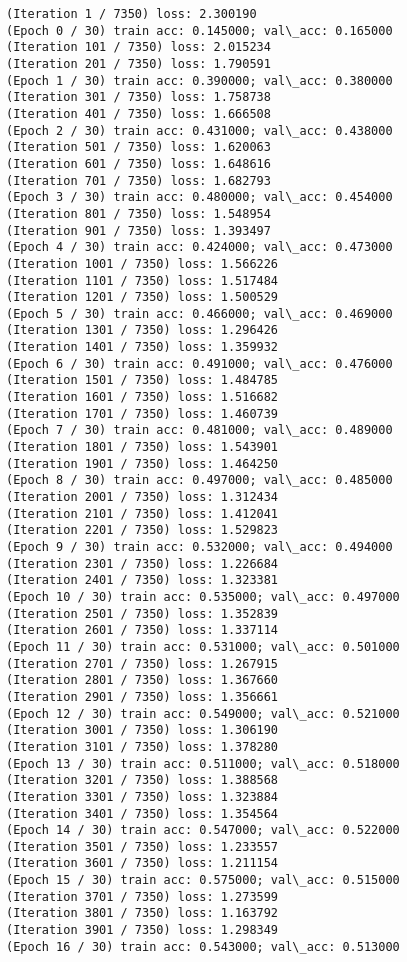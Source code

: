 \documentclass[11pt]{article}
\begin{document}
    \begin{Verbatim}[commandchars=\\\{\}]
(Iteration 1 / 7350) loss: 2.300190
(Epoch 0 / 30) train acc: 0.145000; val\_acc: 0.165000
(Iteration 101 / 7350) loss: 2.015234
(Iteration 201 / 7350) loss: 1.790591
(Epoch 1 / 30) train acc: 0.390000; val\_acc: 0.380000
(Iteration 301 / 7350) loss: 1.758738
(Iteration 401 / 7350) loss: 1.666508
(Epoch 2 / 30) train acc: 0.431000; val\_acc: 0.438000
(Iteration 501 / 7350) loss: 1.620063
(Iteration 601 / 7350) loss: 1.648616
(Iteration 701 / 7350) loss: 1.682793
(Epoch 3 / 30) train acc: 0.480000; val\_acc: 0.454000
(Iteration 801 / 7350) loss: 1.548954
(Iteration 901 / 7350) loss: 1.393497
(Epoch 4 / 30) train acc: 0.424000; val\_acc: 0.473000
(Iteration 1001 / 7350) loss: 1.566226
(Iteration 1101 / 7350) loss: 1.517484
(Iteration 1201 / 7350) loss: 1.500529
(Epoch 5 / 30) train acc: 0.466000; val\_acc: 0.469000
(Iteration 1301 / 7350) loss: 1.296426
(Iteration 1401 / 7350) loss: 1.359932
(Epoch 6 / 30) train acc: 0.491000; val\_acc: 0.476000
(Iteration 1501 / 7350) loss: 1.484785
(Iteration 1601 / 7350) loss: 1.516682
(Iteration 1701 / 7350) loss: 1.460739
(Epoch 7 / 30) train acc: 0.481000; val\_acc: 0.489000
(Iteration 1801 / 7350) loss: 1.543901
(Iteration 1901 / 7350) loss: 1.464250
(Epoch 8 / 30) train acc: 0.497000; val\_acc: 0.485000
(Iteration 2001 / 7350) loss: 1.312434
(Iteration 2101 / 7350) loss: 1.412041
(Iteration 2201 / 7350) loss: 1.529823
(Epoch 9 / 30) train acc: 0.532000; val\_acc: 0.494000
(Iteration 2301 / 7350) loss: 1.226684
(Iteration 2401 / 7350) loss: 1.323381
(Epoch 10 / 30) train acc: 0.535000; val\_acc: 0.497000
(Iteration 2501 / 7350) loss: 1.352839
(Iteration 2601 / 7350) loss: 1.337114
(Epoch 11 / 30) train acc: 0.531000; val\_acc: 0.501000
(Iteration 2701 / 7350) loss: 1.267915
(Iteration 2801 / 7350) loss: 1.367660
(Iteration 2901 / 7350) loss: 1.356661
(Epoch 12 / 30) train acc: 0.549000; val\_acc: 0.521000
(Iteration 3001 / 7350) loss: 1.306190
(Iteration 3101 / 7350) loss: 1.378280
(Epoch 13 / 30) train acc: 0.511000; val\_acc: 0.518000
(Iteration 3201 / 7350) loss: 1.388568
(Iteration 3301 / 7350) loss: 1.323884
(Iteration 3401 / 7350) loss: 1.354564
(Epoch 14 / 30) train acc: 0.547000; val\_acc: 0.522000
(Iteration 3501 / 7350) loss: 1.233557
(Iteration 3601 / 7350) loss: 1.211154
(Epoch 15 / 30) train acc: 0.575000; val\_acc: 0.515000
(Iteration 3701 / 7350) loss: 1.273599
(Iteration 3801 / 7350) loss: 1.163792
(Iteration 3901 / 7350) loss: 1.298349
(Epoch 16 / 30) train acc: 0.543000; val\_acc: 0.513000

\end{Verbatim}
\end{document}
